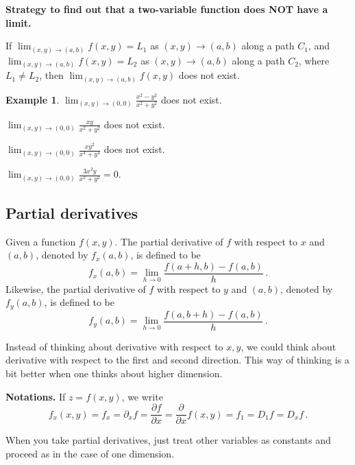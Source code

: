 \documentclass[
]{article}
\theoremstyle{definition}
\theoremstyle{definition}
\newtheorem{example}{Example}[section]
\theoremstyle{definition}
\theoremstyle{definition}
\theoremstyle{remark}
\begin{document}
\textbf{Strategy to find out that a two-variable function does NOT have a limit.}

If \(\lim_{(x,y) \to (a,b)} f(x,y) = L_1\) as \((x,y) \to (a,b)\) along a path \(C_1\),
and \(\lim_{(x,y) \to (a,b)} f(x,y) = L_2\) as \((x,y) \to (a,b)\) along a path \(C_2\),
where \(L_1 \neq L_2\), then \(\lim_{(x,y) \to (a,b)} f(x,y)\) does not exist.

\begin{example}
\(\lim_{(x,y)\to (0,0)} \frac{x^2 - y^2}{x^2 + y^2}\) does not exist.

\(\lim_{(x,y)\to (0,0)} \frac{xy}{x^2 + y^2}\) does not exist.

\(\lim_{(x,y)\to (0,0)} \frac{xy^2}{x^4 + y^4}\) does not exist.

\(\lim_{(x,y)\to (0,0)} \frac{3x^2y}{x^2 + y^2} = 0\).
\end{example}

\subsection{Partial derivatives}\label{partial-derivatives-1}

Given a function \(f(x,y)\). The partial derivative of \(f\) with respect to \(x\) and \((a,b)\),
denoted by \(f_x(a,b)\), is defined to be
\begin{equation*}
    f_x(a,b) = \lim_{h\to 0} \frac{ f(a+h,b) - f(a,b)}{h} \,.
\end{equation*}
Likewise, the partial derivative of \(f\) with respect to \(y\) and \((a,b)\),
denoted by \(f_y(a,b)\), is defined to be
\begin{equation*}
    f_y(a,b) = \lim_{h\to 0} \frac{ f(a,b+h) - f(a,b)}{h} \,.
\end{equation*}

Instead of thinking about derivative with respect to \(x,y\), we could think
about derivative with respect to the first and second direction.
This way of thinking is a bit better when one thinks about higher dimension.

\textbf{Notations.} If \(z = f(x,y)\), we write
\begin{equation*}
    f_x(x,y) = f_x = \partial_x f =  \frac{\partial f}{\partial x} = \frac{\partial}{\partial x} f(x,y) = f_1 = D_1 f = D_x f \,.
\end{equation*}

When you take partial derivatives, just treat other variables as constants and proceed as
in the case of one dimension.
\end{document}

